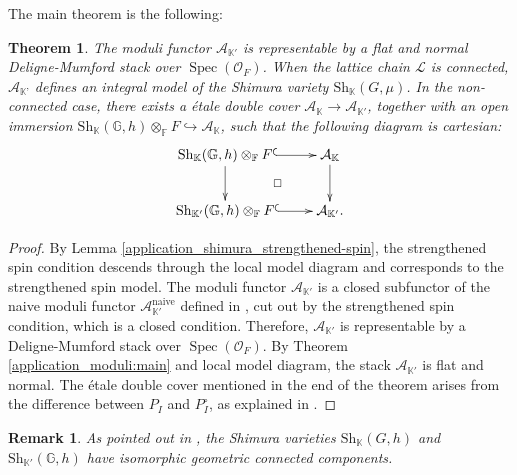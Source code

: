 \documentclass[pdflatex,sn-mathphys-num]{sn-jnl}%
\theoremstyle{thmstyleone}%
\newtheorem{theorem}[subsubsection]{Theorem}%
\theoremstyle{thmstyletwo}%
\newtheorem{remark}[subsubsection]{Remark}%
\numberwithin{equation}{subsection}
\theoremstyle{thmstylethree}%
\newcommand{\BF}{\ensuremath{\mathbb{F}}\xspace}
\newcommand{\BG}{\ensuremath{\mathbb{G}}\xspace}
\newcommand{\BK}{\ensuremath{\mathbb{K}}\xspace}
\newcommand{\CA}{\ensuremath{\mathcal{A}}\xspace}
\newcommand{\CL}{\ensuremath{\mathcal{L}}\xspace}
\newcommand{\CO}{\ensuremath{\mathcal{O}}\xspace}
\newcommand{\naive}{\ensuremath{\mathrm{naive}}\xspace}
\newcommand{\Sh}{\mathrm{Sh}}
\DeclareMathOperator{\Spec}{Spec}
\begin{document}
The main theorem is the following:
\begin{theorem}
The moduli functor $\CA_{\BK'}$ is representable by a flat and normal Deligne-Mumford stack over $\Spec(\CO_F)$. When the lattice chain $\CL$ is connected, $\CA_{\BK’}$ defines an integral model of the Shimura variety $\Sh_\BK(G,\mu)$. 
In the non-connected case, there exists a \'etale double cover $\CA_{\BK}\rightarrow\CA_{\BK'}$, together with an open immersion $\Sh_{\BK}(\BG,h)\otimes_{\BF}F\hookrightarrow\CA_{\BK}$, such that the following diagram is cartesian:
\begin{equation*}
\begin{aligned}
\xymatrix{
\Sh_{\BK}(\BG,h)\otimes_\BF F\ar@{}[rd]|{\square}\ar@{^(->}[r]\ar[d]&\CA_{\BK}\ar[d]\\
\Sh_{\BK'}(\BG,h)\otimes_{\BF}F\ar@{^(->}[r]&\CA_{\BK'}.
}
\end{aligned}
\end{equation*}
\end{theorem}
		
\begin{proof}
By Lemma \ref{application_shimura_strengthened-spin}, the strengthened spin condition descends through the local model diagram and corresponds to the strengthened spin model.
The moduli functor $\CA_{\BK'}$ is a closed subfunctor of the naive moduli functor $\CA_{\BK'}^\naive$ defined in \cite{RZ}, cut out by the strengthened spin condition, which is a closed condition.
Therefore, $\CA_{\BK'}$ is representable by a Deligne-Mumford stack over $\Spec(\CO_F)$.
By Theorem \ref{application_moduli:main} and local model diagram, the stack $\CA_{\BK'}$ is flat and normal.
The \'etale double cover mentioned in the end of the theorem arises from the difference between $P_I$ and $P_I^\circ$, as explained in \cite[Section 1.2, Proposition 1.1]{PR2009}.
\end{proof}
		
\begin{remark}
As pointed out in \cite[\S 1.3]{PR2009}, the Shimura varieties $\Sh_\BK(G,h)$ and $\Sh_{\BK'}(\BG,h)$ have isomorphic geometric connected components.
\end{remark}
\end{document}
